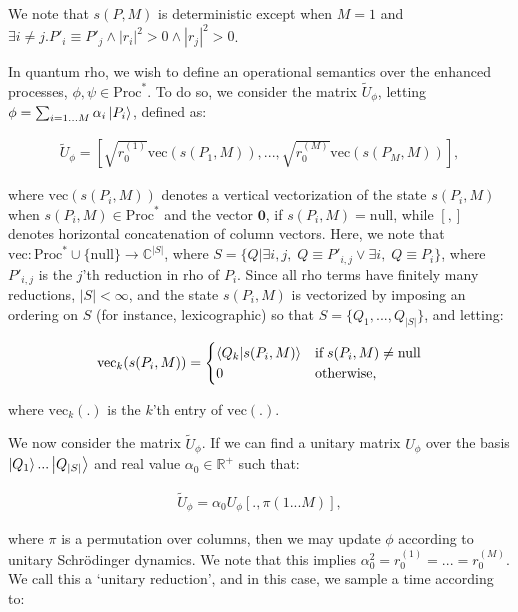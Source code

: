 \noindent We note that $s(P,M)$ is deterministic except when $M=1$ and $\exists i\neq j. P'_i \equiv P'_j \wedge |r_i|^2>0 \wedge |r_j|^2 > 0$.

In quantum rho, we wish to define an operational semantics over the enhanced processes, $\phi,\psi\in \text{Proc}^*$.  To do so, we consider the matrix $\tilde{U}_{\phi}$, letting $\phi=\sum_{i=1...M} \alpha_i \ket{P_i}$, defined as:

\begin{eqnarray}
\tilde{U}_{\phi} = \left[\sqrt{r_0^{(1)}}\text{vec}(s(P_1,M)), ... , \sqrt{r_0^{(M)}}\text{vec}(s(P_M,M))\right],
\end{eqnarray}

\noindent where $\text{vec}(s(P_i,M))$ denotes a vertical vectorization of the state $s(P_i,M)$ when $s(P_i,M) \in \text{Proc}^*$ and the vector $\mathbf{0}$, if $s(P_i,M)=\text{null}$, while $[,]$ denotes horizontal concatenation of column vectors.  Here, we note that $\text{vec}:\text{Proc}^*\cup\{\text{null}\} \rightarrow \mathbb{C}^{|S|}$, where $S=\{Q|\exists i,j, \; Q\equiv P'_{i,j} \vee \exists i, \; Q\equiv P_i\}$, where $P'_{i,j}$ is the $j$'th reduction in rho of $P_i$.  Since all rho terms have finitely many reductions, $|S|<\infty$, and the state $s(P_i,M)$ is vectorized by imposing an ordering on $S$ (for instance, lexicographic) so that $S=\{Q_1,...,Q_{|S|}\}$, and letting:

\begin{eqnarray}
\text{vec}_k(s(P_i,M)) = 
\begin{cases}
\braket{Q_k}{s(P_i,M)} & \text{if} \; s(P_i,M) \neq \text{null} \\
0 & \text{otherwise,}
\end{cases}
\end{eqnarray}

\noindent where $\text{vec}_k(.)$ is the $k$'th entry of $\text{vec}(.)$.

We now consider the matrix $\tilde{U}_\phi$.  If we can find a unitary matrix $U_\phi$ over the basis $\ket{Q_1}...\ket{Q_{|S|}}$ and real value $\alpha_0\in \mathbb{R}^+$ such that:

\begin{eqnarray}\label{eq:unitary}
\tilde{U}_\phi = \alpha_0 U_\phi[.,\pi(1...M)],
\end{eqnarray}

\noindent where $\pi$ is a permutation over columns, then we may update $\phi$ according to unitary Schr\"odinger dynamics.  We note that this implies $\alpha^2_0=r_0^{(1)}=...=r_0^{(M)}$.  We call this a `unitary reduction', and in this case, we sample a time according to:

